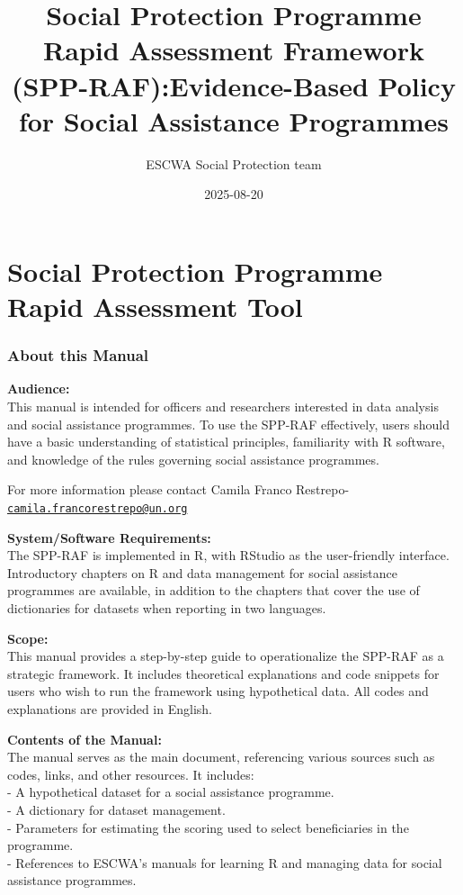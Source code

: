 \documentclass[
]{article}
\title{Social Protection Programme Rapid Assessment Framework
(SPP-RAF):Evidence-Based Policy for Social Assistance Programmes}
\author{ESCWA Social Protection team}
\date{2025-08-20}
\begin{document}
\maketitle

\section{\texorpdfstring{\textbf{Social Protection Programme Rapid
Assessment
Tool}}{Social Protection Programme Rapid Assessment Tool}}\label{social-protection-programme-rapid-assessment-tool}

\subsubsection{\texorpdfstring{\textbf{About this
Manual}}{About this Manual}}\label{about-this-manual}

\textbf{Audience:}\\
This manual is intended for officers and researchers interested in data
analysis and social assistance programmes. To use the SPP-RAF
effectively, users should have a basic understanding of statistical
principles, familiarity with R software, and knowledge of the rules
governing social assistance programmes.

For more information please contact Camila Franco Restrepo-
\href{mailto:camila.francorestrepo@un.org}{\nolinkurl{camila.francorestrepo@un.org}}

\textbf{System/Software Requirements:}\\
The SPP-RAF is implemented in R, with RStudio as the user-friendly
interface. Introductory chapters on R and data management for social
assistance programmes are available, in addition to the chapters that
cover the use of dictionaries for datasets when reporting in two
languages.

\textbf{Scope:}\\
This manual provides a step-by-step guide to operationalize the SPP-RAF
as a strategic framework. It includes theoretical explanations and code
snippets for users who wish to run the framework using hypothetical
data. All codes and explanations are provided in English.

\textbf{Contents of the Manual:}\\
The manual serves as the main document, referencing various sources such
as codes, links, and other resources. It includes:\\
- A hypothetical dataset for a social assistance programme.\\
- A dictionary for dataset management.\\
- Parameters for estimating the scoring used to select beneficiaries in
the programme.\\
- References to ESCWA's manuals for learning R and managing data for
social assistance programmes.
\end{document}
